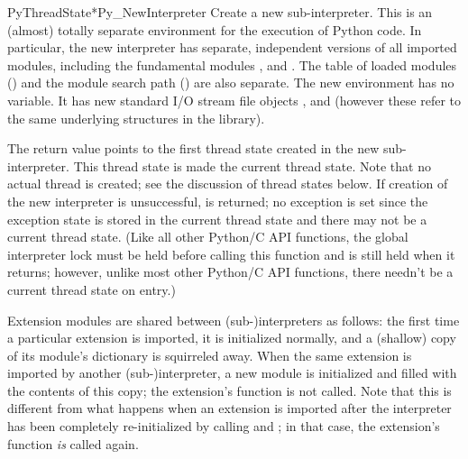 \documentclass{manual}
\begin{document}
\begin{cfuncdesc}{PyThreadState*}{Py_NewInterpreter}{}
Create a new sub-interpreter.  This is an (almost) totally separate
environment for the execution of Python code.  In particular, the new
interpreter has separate, independent versions of all imported
modules, including the fundamental modules
,
 and
.  The table of loaded modules
() and the module search path () are
also separate.  The new environment has no  variable.
It has new standard I/O stream file objects ,
 and  (however these refer to the
same underlying  structures in the \C{} library).

The return value points to the first thread state created in the new 
sub-interpreter.  This thread state is made the current thread state.  
Note that no actual thread is created; see the discussion of thread 
states below.  If creation of the new interpreter is unsuccessful, 
\NULL{} is returned; no exception is set since the exception state 
is stored in the current thread state and there may not be a current 
thread state.  (Like all other Python/C API functions, the global 
interpreter lock must be held before calling this function and is 
still held when it returns; however, unlike most other Python/C API 
functions, there needn't be a current thread state on entry.)

Extension modules are shared between (sub-)interpreters as follows: 
the first time a particular extension is imported, it is initialized 
normally, and a (shallow) copy of its module's dictionary is 
squirreled away.  When the same extension is imported by another 
(sub-)interpreter, a new module is initialized and filled with the 
contents of this copy; the extension's  function is not
called.  Note that this is different from what happens when an
extension is imported after the interpreter has been completely
re-initialized by calling  and
; in that case, the extension's 
function \emph{is} called again.


\end{cfuncdesc}
\end{document}
